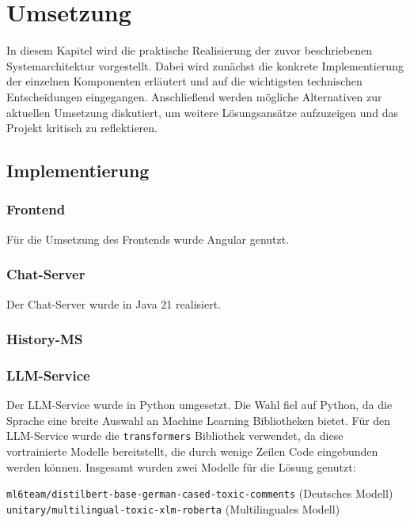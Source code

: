 \documentclass[12pt]{report}
\begin{document}
\chapter{Umsetzung}

In diesem Kapitel wird die praktische Realisierung der zuvor beschriebenen Systemarchitektur vorgestellt. Dabei wird zunächst die konkrete Implementierung der einzelnen Komponenten erläutert und auf die wichtigsten technischen Entscheidungen eingegangen. Anschließend werden mögliche Alternativen zur aktuellen Umsetzung diskutiert, um weitere Lösungsansätze aufzuzeigen und das Projekt kritisch zu reflektieren.

\section{Implementierung}

\subsection{Frontend}
Für die Umsetzung des Frontends wurde Angular genutzt.
\subsection{Chat-Server}
Der Chat-Server wurde in Java 21 realisiert.
\subsection{History-MS}

\subsection{LLM-Service}

Der LLM-Service wurde in Python umgesetzt. Die Wahl fiel auf Python, da die Sprache eine breite Auswahl an Machine Learning Bibliotheken bietet. Für den LLM-Service wurde die \texttt{transformers} Bibliothek verwendet, da diese vortrainierte Modelle bereitstellt, die durch wenige Zeilen Code eingebunden werden können.
\newline\newline
Insgesamt wurden zwei Modelle für die Lösung genutzt:

\begin{center}
\texttt{ml6team/distilbert-base-german-cased-toxic-comments} (Deutsches Modell) \texttt{unitary/multilingual-toxic-xlm-roberta} (Multilinguales Modell)
\end{center}
\end{document}
